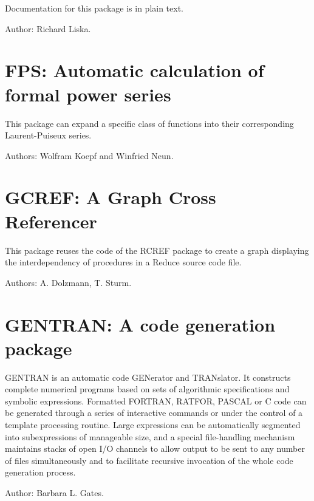 Documentation for this package is in plain text.

Author: Richard Liska.


\newpage

\section{FPS: Automatic calculation of formal power series}

This package can expand a specific class of functions into their
corresponding Laurent-Puiseux series.

Authors: Wolfram Koepf and Winfried Neun.


\newpage


\section{GCREF: A Graph Cross Referencer}
\label{GCREF}

This package reuses the code of the RCREF package to create a graph displaying
the interdependency of procedures in a Reduce source code file. 

Authors: A. Dolzmann, T. Sturm.


\newpage

\section{GENTRAN: A code generation package} 
\label{GENTRAN}

GENTRAN is an automatic code GENerator and TRANslator. It constructs
complete numerical programs based on sets of algorithmic specifications
and symbolic expressions. Formatted FORTRAN, RATFOR, PASCAL or C code can be
generated through a series of interactive commands or under the control of
a template processing routine. Large expressions can be automatically
segmented into subexpressions of manageable size, and a special
file-handling mechanism maintains stacks of open I/O channels to allow
output to be sent to any number of files simultaneously and to facilitate
recursive invocation of the whole code generation process.

Author: Barbara L. Gates.


